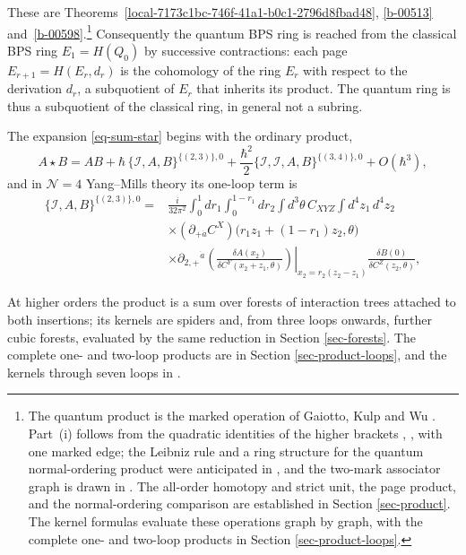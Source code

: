 \documentclass[11pt]{article}
\numberwithin{equation}{section}
\numberwithin{figure}{section}
\numberwithin{table}{section}
\begin{document}
These are Theorems~\ref{local-7173c1bc-746f-41a1-b0c1-2796d8fbad48}, \ref{b-00513} and~\ref{b-00598}.\footnote{The quantum product is the marked operation of Gaiotto, Kulp and Wu \cite[Sections 4.3 and 4.5]{higher}. Part~(i) follows from the quadratic identities of the higher brackets \cite[Section 3.2]{operatope}, \cite[Theorem 7]{Wang}, \cite[Equations (4.19), (4.42)]{higher} with one marked edge; the Leibniz rule and a ring structure for the quantum normal-ordering product were anticipated in \cite[Section 2.2 and footnote 28]{semichiral}, and the two-mark associator graph is drawn in \cite[Figure 7]{higher}. The all-order homotopy and strict unit, the page product, and the normal-ordering comparison are established in Section \ref{sec-product}. The kernel formulas evaluate these operations graph by graph, with the complete one- and two-loop products in Section \ref{sec-product-loops}.} Consequently the quantum BPS ring is reached from the classical BPS ring $E_1=H(Q_0)$ by successive contractions: each page $E_{r+1}=H(E_r,d_r)$ is the cohomology of the ring $E_r$ with respect to the derivation $d_r$, a subquotient of $E_r$ that inherits its product. The quantum ring is thus a subquotient of the classical ring, in general not a subring.

The expansion \eqref{eq-sum-star} begins with the ordinary product,
\begin{equation}\label{eq-sum-product-expansion}
A\star B=AB+\hbar\,\{\mathcal I,A,B\}^{\{(2,3)\},0}+\frac{\hbar^2}{2}\{\mathcal I,\mathcal I,A,B\}^{\{(3,4)\},0}+O(\hbar^3),
\end{equation}
and in $\mathcal N=4$ Yang--Mills theory its one-loop term is
\begin{equation}\label{eq-sum-product1}
\begin{aligned}
\{\mathcal I,A,B\}^{\{(2,3)\},0}
={}&\frac{i}{32\pi^2}\int_0^1dr_1\int_0^{1-r_1}dr_2
\int d^3\theta\,C_{XYZ}\int d^4z_1\,d^4z_2\\
&\times(\partial_{+\dot a}C^X)\big(r_1z_1+(1-r_1)z_2,\theta\big)\\
&\times\left.
\partial_{2,+}{}^{\dot a}
\left(\frac{\delta A(x_2)}{\delta C^Y(x_2+z_1,\theta)}\right)
\right|_{x_2=r_2(z_2-z_1)}
\frac{\delta B(0)}{\delta C^Z(z_2,\theta)},
\end{aligned}
\end{equation}

At higher orders the product is a sum over forests of interaction trees attached to both insertions; its kernels are spiders and, from three loops onwards, further cubic forests, evaluated by the same reduction in Section \ref{sec-forests}. The complete one- and two-loop products are in Section \ref{sec-product-loops}, and the kernels through seven loops in \cite{KernelRepo}.
\end{document}

